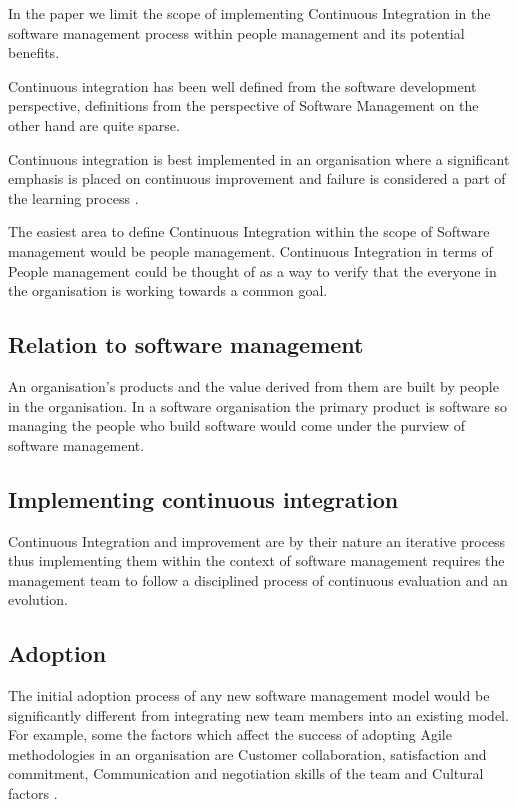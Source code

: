 \documentclass[12pt,conference]{IEEEtran}
\begin{document}
In the paper we limit the scope of implementing Continuous Integration in the software management process within people management and its potential benefits.

Continuous integration has been well defined from the software development perspective, definitions from the perspective of Software Management on the other hand are quite sparse. 

Continuous integration is best implemented in an organisation where a significant emphasis is placed on continuous improvement and failure is considered a part of the learning process \cite{edmondson_strategies_2011}.

The easiest area to define Continuous Integration within the scope of Software management would be people management. Continuous Integration in terms of People management could be thought of as a way to verify that the everyone in the organisation is working towards a common goal.


\subsection*{Relation to software management}

An organisation's products and the value derived from them are built by people in the organisation. In a software organisation the primary product is software so managing the people who build software would come under the purview of software management. 

\subsection*{Implementing continuous integration}

Continuous Integration and improvement are by their nature an iterative process thus implementing them within the context of software management requires the management team to follow a disciplined process of continuous evaluation and an evolution.

\subsection*{Adoption}

The initial adoption process of any new software management model would be significantly different from integrating new team members into an existing model. For example, some the factors which affect the success of adopting Agile methodologies in an organisation are 
Customer collaboration, satisfaction and commitment, Communication and negotiation skills of the team and Cultural factors \cite{misra_identifying_2009}.
\end{document}
